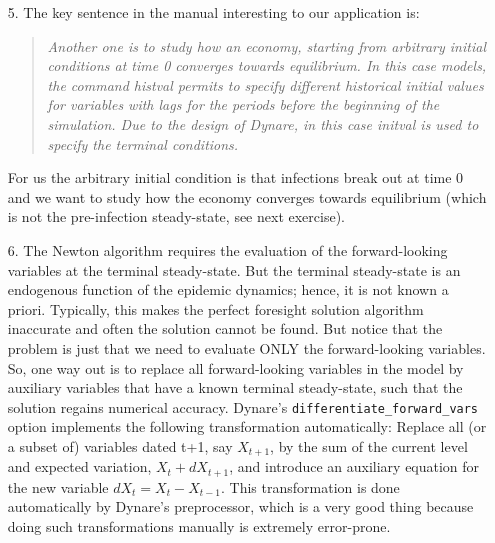 \begin{itemize}
\item[5.] The key sentence in the manual interesting to our application is:
\begin{quote}
\emph{Another one is to study how an economy, starting from arbitrary initial conditions at time 0 converges towards equilibrium.
In this case models, the command histval permits to specify different historical initial values for variables with lags for the periods before the beginning of the simulation.
Due to the design of Dynare, in this case initval is used to specify the terminal conditions.}
\end{quote}
For us the arbitrary initial condition is that infections break out at time 0
  and we want to study how the economy converges towards equilibrium (which is not the pre-infection steady-state, see next exercise).


\item[6.] The Newton algorithm requires the evaluation of the forward-looking variables at the terminal steady-state.
But the terminal steady-state is an endogenous function of the epidemic dynamics;
  hence, it is not known a priori.
Typically, this makes the perfect foresight solution algorithm inaccurate and often the solution cannot be found.
But notice that the problem is just that we need to evaluate ONLY the forward-looking variables.
So, one way out is to replace all forward-looking variables in the model by auxiliary variables
  that have a known terminal steady-state, such that the solution regains numerical accuracy.
Dynare's \texttt{differentiate\_forward\_vars} option implements the following transformation automatically:
Replace all (or a subset of) variables dated t+1, say $X_{t+1}$,
  by the sum of the current level and expected variation, $X_t + dX_{t+1}$,
  and introduce an auxiliary equation for the new variable $dX_t=X_t-X_{t-1}$.
This transformation is done automatically by Dynare's preprocessor,
  which is a very good thing because doing such transformations manually is extremely error-prone.


\end{itemize}
